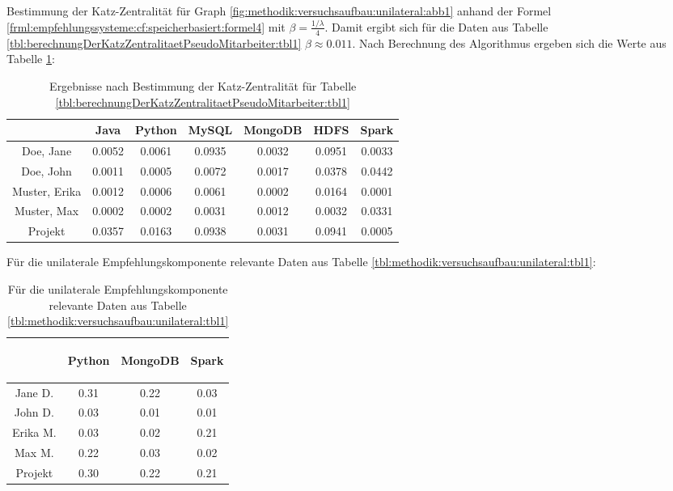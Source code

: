 Bestimmung der Katz-Zentralität für Graph \ref{fig:methodik:versuchsaufbau:unilateral:abb1} anhand der Formel \ref{frml:empfehlungssysteme:cf:speicherbasiert:formel4} mit $\beta = \frac{1/\lambda}{4}$. Damit ergibt sich für die Daten aus Tabelle \ref{tbl:berechnungDerKatzZentralitaetPseudoMitarbeiter:tbl1} $\beta \approx 0.011$. Nach Berechnung des Algorithmus ergeben sich die Werte aus Tabelle \ref{tbl:berechnungDerKatzZentralitaetPseudoMitarbeiter:tbl2}:

\begin{table}[h]
	\centering
	\begin{tabular}{c|c|c|c|c|c|c}
		& Java & Python & MySQL & MongoDB & HDFS & Spark\\ 
		\hline
		Doe, Jane     & 0.0052 & 0.0061 & 0.0935 & 0.0032 & 0.0951 & 0.0033\\
		Doe, John     & 0.0011 & 0.0005 & 0.0072 & 0.0017 & 0.0378 & 0.0442\\
		Muster, Erika & 0.0012 & 0.0006 & 0.0061 & 0.0002 & 0.0164 & 0.0001\\
		Muster, Max   & 0.0002 & 0.0002 & 0.0031 & 0.0012 & 0.0032 & 0.0331\\
		Projekt       & 0.0357 & 0.0163 & 0.0938 & 0.0031 & 0.0941 & 0.0005\\
	\end{tabular}
	\caption{Ergebnisse nach Bestimmung der Katz-Zentralität für Tabelle \ref{tbl:berechnungDerKatzZentralitaetPseudoMitarbeiter:tbl1}}
	\label{tbl:berechnungDerKatzZentralitaetPseudoMitarbeiter:tbl2}
\end{table}






Für die unilaterale Empfehlungskomponente relevante Daten aus Tabelle \ref{tbl:methodik:versuchsaufbau:unilateral:tbl1}:

\begin{table}[h]
	\centering
	\begin{tabular}{c|c|c|c}
		& \begin{sideways}Python\end{sideways} & \begin{sideways}MongoDB\end{sideways} & \begin{sideways}Spark\end{sideways} \\
		\hline
		Jane D.  & 0.31 & 0.22 & 0.03\\
		John D.  & 0.03 & 0.01 & 0.01\\
		Erika M. & 0.03 & 0.02 & 0.21\\
		Max M.   & 0.22 & 0.03 & 0.02\\
		Projekt  & 0.30 & 0.22 & 0.21\\
	\end{tabular}
	\caption{Für die unilaterale Empfehlungskomponente relevante Daten aus Tabelle \ref{tbl:methodik:versuchsaufbau:unilateral:tbl1}}
	\label{tbl:nebenrechnungen:unilateral:tbl1}
\end{table}

